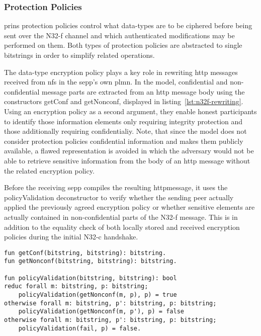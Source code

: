 \subsubsection{Protection Policies}

\gls{prins} protection policies control what data-types are to be ciphered before being sent over the N32-f channel and which authenticated modifications may be performed on them.
Both types of protection policies are abstracted to single bitstrings in order to simplify related operations.

The data-type encryption policy plays a key role in rewriting \gls{http} messages received from \glspl{nf} in the \gls{sepp}'s own \gls{plmn}.
In the model, confidential and non-confidential message parts are extracted from an \gls{http} message body using the constructors {\sffamily getConf} and {\sffamily getNonconf}, displayed in listing~\ref{lst:n32f-rewriting}.
Using an encryption policy as a second argument, they enable honest participants to identify those information elements only requiring integrity protection and those additionally requiring confidentialiy.
Note, that since the model does not consider protection policies confidential information and makes them publicly available, a flawed representation is avoided in which the adversary would not be able to retrieve sensitive information from the body of an \gls{http} message without the related encryption policy.

Before the receiving \gls{sepp} compiles the resulting \gls{http}message, it uses the {\sffamily policyValidation} deconstructor to verify whether the sending peer actually applied the previously agreed encryption policy or whether sensitive elements are actually contained in non-confidential parts of the N32-f message.
This is in addition to the equality check of both locally stored and received encryption policies during the initial N32-c handshake.

\begin{lstlisting}[caption={N32-f Message Rewriting Functions},label={lst:n32f-rewriting},firstnumber=136]
fun getConf(bitstring, bitstring): bitstring.
fun getNonconf(bitstring, bitstring): bitstring.

fun policyValidation(bitstring, bitstring): bool
reduc forall m: bitstring, p: bitstring;
    policyValidation(getNonconf(m, p), p) = true
otherwise forall m: bitstring, p': bitstring, p: bitstring;
    policyValidation(getNonconf(m, p'), p) = false
otherwise forall m: bitstring, p': bitstring, p: bitstring;
    policyValidation(fail, p) = false.
\end{lstlisting}

